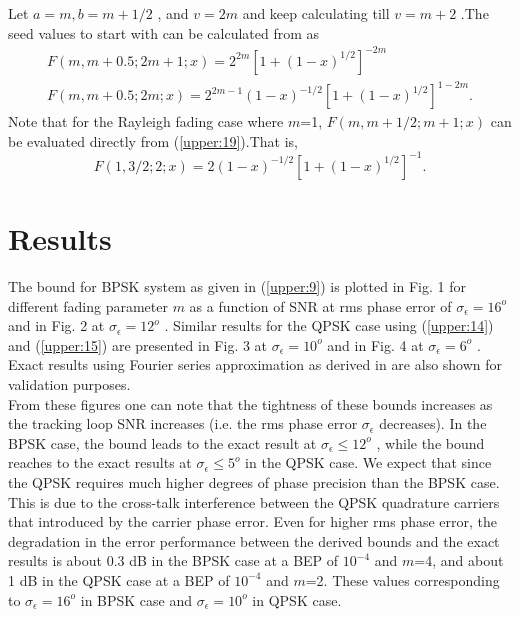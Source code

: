 Let $a=m, b=m+1/2$  , and $v=2m$  and keep calculating till
$v=m+2$ .The seed values to start with can be calculated from
\cite [eq's. 15.1.13,14]{abramowitz:1972} as
\begin{equation}
\label{upper:19}
\begin{split}
F(m,m+0.5;2m+1;x)=2^{2m}\left[1+(1-x)^{1/2}\right]^{-2m}\\
F(m,m+0.5;2m;x)=2^{2m-1}(1-x)^{-1/2}\left[1+(1-x)^{1/2}\right]^{1-2m}.
\end{split}
\end{equation}
Note that for the Rayleigh fading case where $m$=1,
$F(m,m+1/2;m+1;x)$  can be evaluated directly from
(\ref{upper:19}).That is,
\begin{equation}
\label{upper:20}
F(1,3/2;2;x)=2(1-x)^{-1/2}\left[1+(1-x)^{1/2}\right]^{-1}.
\end{equation}

\section{Results}
The bound for BPSK system as given in (\ref{upper:9}) is plotted
in Fig. 1 for different fading parameter $m$ as a function of SNR
at rms phase error of $\sigma_\epsilon=16^o$ and in Fig. 2 at
$\sigma_\epsilon=12^o$ . Similar results for the QPSK case using
(\ref{upper:14}) and (\ref{upper:15}) are presented in Fig. 3 at
$\sigma_\epsilon=10^o$ and in Fig. 4 at $\sigma_\epsilon=6^o$ .
Exact results using Fourier series approximation as derived in
\cite{smadi:TBParticle01} are also shown for validation
purposes.\\

From these figures one can note that the tightness of these bounds
increases as the tracking loop SNR increases (i.e. the rms phase
error $\sigma_\epsilon$  decreases). In the BPSK case, the bound
leads to the exact result at $\sigma_\epsilon\le 12^o$  , while
the bound reaches to the exact results at  $\sigma_\epsilon\le
5^o$ in the QPSK case. We expect that since the QPSK requires much
higher degrees of phase precision than the BPSK case. This is due
to the cross-talk interference between the QPSK quadrature
carriers that introduced by the carrier phase error. Even for
higher rms phase error, the degradation in the error performance
between the derived bounds and the exact results is about 0.3 dB
in the BPSK case at a BEP of $10^{-4}$ and $m$=4, and about 1 dB
in the QPSK case at a BEP of  $10^{-4}$ and $m$=2. These values
corresponding to $\sigma_\epsilon=16^o$ in BPSK case and $\sigma_\epsilon=10^o$ in QPSK case.\\

